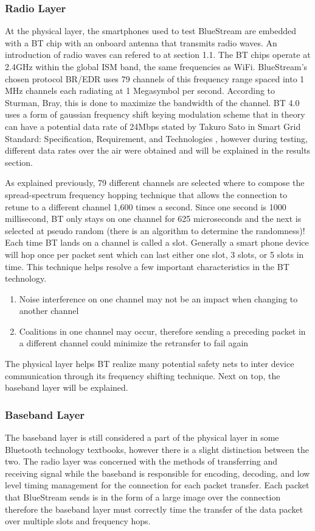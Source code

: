 \documentclass[a4paper,12pt]{article}
\begin{document}
\subsubsection{Radio Layer}
At the physical layer, the smartphones used to test BlueStream are embedded with a BT chip with an onboard antenna that transmits radio waves. An introduction of radio waves can refered to at section 1.1. The BT chips operate at 2.4GHz within the global ISM band, the same frequencies as WiFi. BlueStream’s chosen protocol BR/EDR uses 79 channels of this frequency range spaced into 1 MHz channels each radiating at 1 Megasymbol per second. According to Sturman, Bray, this is done to maximize the bandwidth of the channel. BT 4.0 uses a form of gaussian frequency shift keying modulation scheme that in theory can have a potential data rate of 24Mbps stated by Takuro Sato in Smart Grid Standard: Specification, Requirement, and Technologies \cite{SmartGrids}, however during testing, different data rates over the air were obtained and will be explained in the results section. 

As explained previously, 79 different channels are selected where to compose the spread-spectrum frequency hopping technique that allows the connection to retune to a different channel 1,600 times a second. Since one second is 1000 millisecond, BT only stays on one channel for 625 microseconds and the next is selected at pseudo random (there is an algorithm to determine the randomness)! Each time BT lands on a channel is called a slot. Generally a smart phone device will hop once per packet sent which can last either one slot, 3 slots, or 5 slots in time. This technique helps resolve a few important characteristics in the BT technology.

\begin{enumerate}
\item Noise interference on one channel may not be an impact when changing to another channel
\item Coalitions in one channel may occur, therefore sending a preceding packet in a different channel could minimize the retransfer to fail again
\end{enumerate}

The physical layer helps BT realize many potential safety nets to inter device communication through its frequency shifting technique. Next on top, the baseband layer will be explained.

\subsubsection{Baseband Layer}
The baseband layer is still considered a part of the physical layer in some Bluetooth technology textbooks, however there is a slight distinction between the two. The radio layer was concerned with the methods of transferring and receiving signal while the baseband is responsible for encoding, decoding, and low level timing management for the connection for each packet transfer. Each packet that BlueStream sends is in the form of a large image over the connection therefore the baseband layer must correctly time the transfer of the data packet over multiple slots and frequency hops. 
\end{document}
